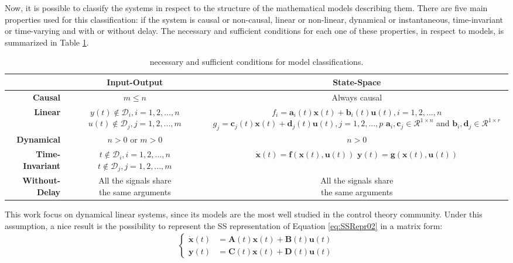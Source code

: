 \documentclass[a4paper,11pt]{book}
\numberwithin{figure}{chapter}
\numberwithin{equation}{chapter}
\numberwithin{table}{chapter}
\theoremstyle{definition}
\begin{document}
Now, it is possible to classify the systems in respect to the structure of the mathematical models describing them. There are five main properties used for this classification: if the system is causal or non-causal, linear or non-linear, dynamical or instantaneous, time-invariant or time-varying and with or without delay. The necessary and sufficient conditions for each one of these properties, in respect to models, is summarized in Table \ref{table:classes01}.

\begin{table}[hp]
	\centering
	\begin{tabular}{r | c | c }
	 & \textbf{Input-Output} & \textbf{State-Space} \\
	\hline 
		\textbf{Causal}			& $m \leq n$ & Always causal \\
	\hline 
		\textbf{Linear}			& \makecell{$y(t) \notin \mathcal{D}_i, i=1,2,...,n$\\$u(t) \notin \mathcal{D}_j, j=1,2,...,m$} & \makecell{$f_i = \mathbf{a}_i(t) \mathbf{x}(t) + \mathbf{b}_i(t) \mathbf{u}(t), i = 1,2,...,n$ \\ $g_j = \mathbf{c}_j(t) \mathbf{x}(t) + \mathbf{d}_j(t) \mathbf{u}(t), j = 1,2,...,p$ \\ $\mathbf{a}_i,\mathbf{c}_j \in \mathcal{R}^{1 \times n}$ and $\mathbf{b}_i, \mathbf{d}_j \in \mathcal{R}^{1 \times r}$} \\
	\hline 
		\textbf{Dynamical}		& $n > 0$ or $m > 0$ & $n > 0$ \\
	\hline 
		\textbf{Time-Invariant}	& \makecell{$t \notin \mathcal{D}_i, i=1,2,...,n$\\$t \notin \mathcal{D}_j, j=1,2,...,m$} & \makecell{$\dot{\mathbf{x}}(t) = \mathbf{f}(\mathbf{x}(t), \mathbf{u}(t))$ \\ $\mathbf{y}(t) = \mathbf{g}(\mathbf{x}(t), \mathbf{u}(t))$} \\
	\hline 
		\textbf{Without-Delay}	& \makecell{All the signals share\\the same arguments} & \makecell{All the signals share\\the same arguments} \\
	\end{tabular} 
	\caption{necessary and sufficient conditions for model classifications.}
	\label{table:classes01}	
\end{table} 

This work focus on dynamical linear systems, since its models are the most well studied in the control theory community. Under this assumption, a nice result is the possibility to represent the SS representation of Equation \eqref{eq:SSRepr02} in a matrix form:
\begin{align} \label{eq:SSRepr03}
\begin{cases}
	\dot{\mathbf{x}}(t) &= \mathbf{A}(t) \mathbf{x}(t) + \mathbf{B}(t) \mathbf{u}(t) \\
	\mathbf{y}(t) &= \mathbf{C}(t) \mathbf{x}(t) + \mathbf{D}(t) \mathbf{u}(t)
\end{cases}
\end{align}
\end{document}
